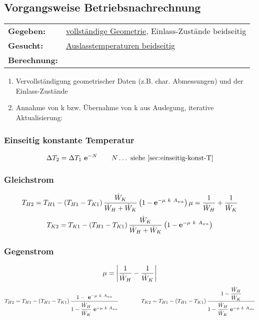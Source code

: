 \clearpage
\subsection{Vorgangsweise Betriebsnachrechnung}
	\begin{tabular}{ll}
		\textbf{Gegeben:}    & \underline{vollständige Geometrie}, Einlass-Zustände beidseitig \\
		\textbf{Gesucht:}    & \underline{Auslasstemperaturen beidseitig}                      \\
		\textbf{Berechnung:} &
	\end{tabular}
		\vspace{-6pt}
		\begin{enumerate}[leftmargin=4em]
			\item Vervollständigung geometrischer Daten (z.B. char. Abmessungen) und der Einlass-Zustände \vspace{-6pt}
			\item Annahme von k bzw. Übernahme von k aus Auslegung, iterative Aktualisierung:
		\end{enumerate}

\subsubsection{Einseitig konstante Temperatur }
	\[ \Delta T_2 = \Delta T_1\ \eul^{-N}   \qquad N\dots \text{ siehe \ref{sec:einseitig-konst-T}} \]

\subsubsection{Gleichstrom}
	\setlength{\abovedisplayshortskip}{-5pt}
	\[
		T_{H2} =  T_{H1} - (T_{H1} - T_{K1})\, \dfrac{\dot{W}_K}{\dot{W}_H + \dot{W}_K} \left(1- \eul^{-\mu\ k\ A_{wa}}\right)
		\hfil \mu = \dfrac{1}{\dot{W}_H} + \dfrac{1}{\dot{W}_K} \hfil
	\]
	\[
		T_{K2} =  T_{K1} - (T_{H1} - T_{K1})\, \dfrac{\dot{W}_K}{\dot{W}_H + \dot{W}_K} \left(1- \eul^{-\mu\ k\ A_{wa}}\right)
	\]

\subsubsection{Gegenstrom}
	\[
		\mu  = \left|\dfrac{1}{\dot{W}_H} - \dfrac{1}{\dot{W}_K}\right|
	\]
	\[
		 T_{H2} =  T_{H1} - (T_{H1} - T_{K1})\, \dfrac{1-\ \eul^{-\mu\ k\ A_{wa}}}  {1- \dfrac{\dot{W}_H}{\dot{W}_K}\ \eul^{-\mu\ k\ A_{wa}}}
		 \qquad\qquad
		 T_{K2}  =  {T_{H1}} - (T_{H1} - T_{K1})\, \dfrac{1- \dfrac{\dot{W}_H}{\dot{W}_K}}  {1- \dfrac{\dot{W}_H}{\dot{W}_K}\ \eul^{-\mu\ k\ A_{wa}}}
	\]

